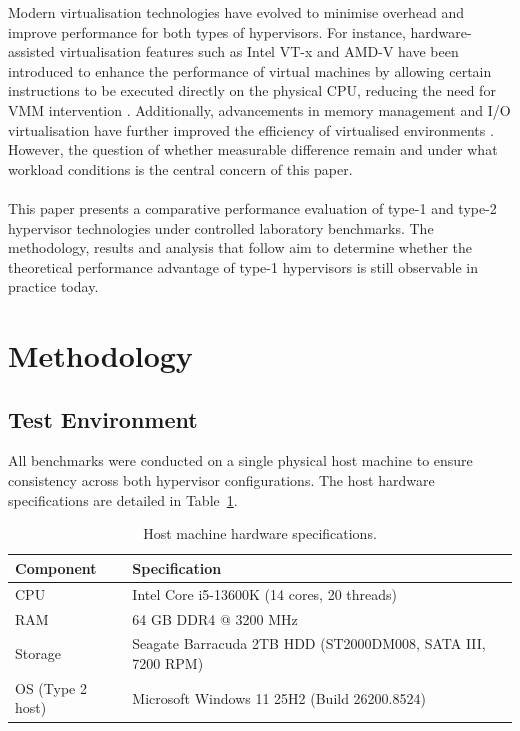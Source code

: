 \documentclass[a4paper, 12pt]{article}
\theoremstyle{plain}
\theoremstyle{definition}
\theoremstyle{remark}
\begin{document}
    \noindent Modern virtualisation technologies have evolved to minimise overhead and improve
     performance for both types of hypervisors. For instance,
     hardware-assisted virtualisation features such as
     Intel VT-x and AMD-V have been introduced to enhance the performance
      of virtual machines by allowing certain instructions to be executed
      directly on the physical CPU, reducing the need for VMM intervention
      \parencite{smalleyWhatAreHypervisors2024}. Additionally, advancements
      in memory management and I/O virtualisation have further improved the
      efficiency of virtualised environments \parencite{barhamXenArtVirtualization2003}. However, the question of whether
      measurable difference remain and under what workload conditions is the
      central concern of this paper.\\
    \\
    \noindent This paper presents a comparative performance evaluation of
    type-1 and type-2 hypervisor technologies under controlled laboratory benchmarks.
    The methodology, results and analysis that follow aim to determine whether the
    theoretical performance advantage of type-1 hypervisors is still observable
    in practice today.
    \section{Methodology}

    \subsection{Test Environment}

    All benchmarks were conducted on a single physical host machine to ensure
    consistency across both hypervisor configurations. The host hardware
    specifications are detailed in Table~\ref{tab:hardware}.

    \begin{table}[H]
    \centering
    \caption{Host machine hardware specifications.}
    \label{tab:hardware}
    \begin{tabular}{ll}
    \hline
    \textbf{Component} & \textbf{Specification} \\
    \hline
    CPU    & Intel Core i5-13600K (14 cores, 20 threads) \\
    RAM    & 64 GB DDR4 @ 3200 MHz \\
    Storage & Seagate Barracuda 2TB HDD (ST2000DM008, SATA III, 7200 RPM) \\
    OS (Type 2 host) & Microsoft Windows 11 25H2 (Build 26200.8524) \\
    \hline
    \end{tabular}
    \end{table}
\end{document}
